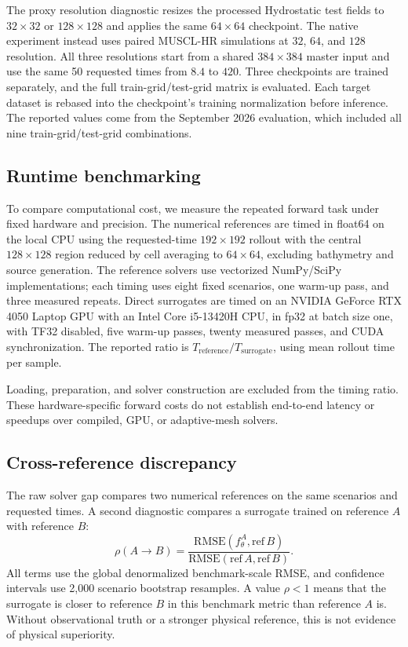 The proxy resolution diagnostic resizes the processed Hydrostatic test fields to $32 \times 32$ or $128 \times 128$ and applies the same $64 \times 64$ checkpoint. The native experiment instead uses paired MUSCL-HR simulations at $32$, $64$, and $128$ resolution. All three resolutions start from a shared $384 \times 384$ master input and use the same 50 requested times from $8.4$ to $420$. Three checkpoints are trained separately, and the full train-grid/test-grid matrix is evaluated. Each target dataset is rebased into the checkpoint's training normalization before inference. The reported values come from the September 2026 evaluation, which included all nine train-grid/test-grid combinations.

\subsection{Runtime benchmarking}
\label{subsec:runtime}

To compare computational cost, we measure the repeated forward task under fixed hardware and precision. The numerical references are timed in float64 on the local CPU using the requested-time $192 \times 192$ rollout with the central $128 \times 128$ region reduced by cell averaging to $64 \times 64$, excluding bathymetry and source generation. The reference solvers use vectorized NumPy/SciPy implementations; each timing uses eight fixed scenarios, one warm-up pass, and three measured repeats. Direct surrogates are timed on an NVIDIA GeForce RTX 4050 Laptop GPU with an Intel Core i5-13420H CPU, in fp32 at batch size one, with TF32 disabled, five warm-up passes, twenty measured passes, and CUDA synchronization. The reported ratio is $T_{\mathrm{reference}}/T_{\mathrm{surrogate}}$, using mean rollout time per sample.

Loading, preparation, and solver construction are excluded from the timing ratio. These hardware-specific forward costs do not establish end-to-end latency or speedups over compiled, GPU, or adaptive-mesh solvers.

\subsection{Cross-reference discrepancy}
\label{subsec:cross-solver}

The raw solver gap compares two numerical references on the same scenarios and requested times. A second diagnostic compares a surrogate trained on reference $A$ with reference $B$:
\begin{equation}
\rho(A \rightarrow B) = 
\frac{\mathrm{RMSE}(f_\theta ^ A, \mathrm{ref}\, B)}
     {\mathrm{RMSE}(\mathrm{ref}\, A, \mathrm{ref}\, B)}.
\end{equation}
All terms use the global denormalized benchmark-scale RMSE, and confidence intervals use 2,000 scenario bootstrap resamples. A value $\rho < 1$ means that the surrogate is closer to reference $B$ in this benchmark metric than reference $A$ is. Without observational truth or a stronger physical reference, this is not evidence of physical superiority.

